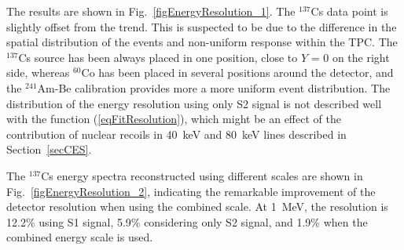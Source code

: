 The results are shown in Fig.~\ref{figEnergyResolution_1}. The $^{137}$Cs data point is slightly offset from the trend. This is suspected to be due to the difference in the spatial distribution of the events and non-uniform response within the TPC. The $^{137}$Cs source has been always placed in one position, close to $Y$ = 0 on the right side, whereas $^{60}$Co has been placed in several positions around the detector, and the $^{241}$Am-Be calibration provides more a more uniform event distribution. The distribution of the energy resolution using only S2 signal is not described well with the function (\ref{eqFitResolution}), which might be an effect of the contribution of nuclear recoils in 40~keV and 80~keV lines described in Section~\ref{secCES}. 

The $^{137}$Cs energy spectra reconstructed using different scales are shown in Fig.~\ref{figEnergyResolution_2}, indicating the remarkable improvement of the detector resolution when using the combined scale. At 1~MeV, the resolution is 12.2\% using S1 signal, 5.9\% considering only S2 signal, and 1.9\% when the combined energy scale is used.



